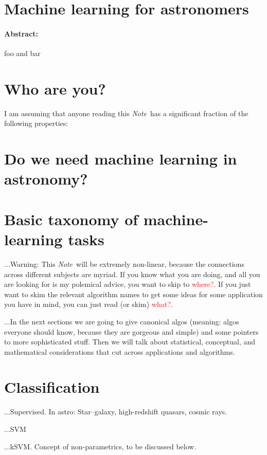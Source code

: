 \documentclass[12pt, letterpaper]{article}
\newcommand{\documentname}{\textsl{Note}}
\newcommand{\todo}[1]{\textcolor{red}{#1}}  %
\begin{document}
\section*{Machine learning for astronomers}

\paragraph{Abstract:} foo and bar

\section{Who are you?}

I am assuming that anyone reading this \documentname\ has a
significant fraction of the following properties:

\section{Do we need machine learning in astronomy?}

\section{Basic taxonomy of machine-learning tasks}

...Warning: This \documentname\ will be extremely non-linear, because
the connections across different subjects are myriad. If you know what
you are doing, and all you are looking for is my polemical advice, you
want to skip to \todo{where?}. If you just want to skim the relevant
algorithm names to get some ideas for some application you have in
mind, you can just read (or skim) \todo{what?}.

...In the next sections we are going to give canonical algos (meaning:
algos everyone should know, because they are gorgeous and simple) and
some pointers to more sophisticated stuff. Then we will talk about
statistical, conceptual, and mathematical considerations that cut
across applications and algorithms.

\section{Classification}

...Supervised. In astro: Star--galaxy, high-redshift quasars, cosmic rays.

...SVM

...kSVM. Concept of non-parametrics, to be discussed below.
\end{document}
